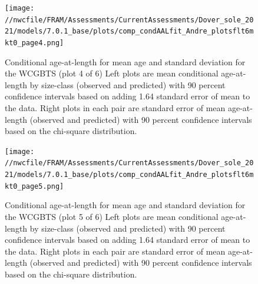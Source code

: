 \documentclass[11pt,
  english,
  a4paper,
]{article}
\begin{document}
\tagmcend\tagstructend


\begin{figure}
\centering
\texttt{[image: //nwcfile/FRAM/Assessments/CurrentAssessments/Dover\_sole\_2021/models/7.0.1\_base/plots/comp\_condAALfit\_Andre\_plotsflt6mkt0\_page4.png]}
\caption{Conditional age-at-length for mean age and standard deviation for the WCGBTS (plot 4 of 6) Left plots are mean conditional age-at-length by size-class (observed and predicted) with 90 percent confidence intervals based on adding 1.64 standard error of mean to the data. Right plots in each pair are standard error of mean age-at-length (observed and predicted) with 90 percent confidence intervals based on the chi-square distribution.\label{fig:wcgbt-caal-fit-4}}
\end{figure}

\tagmcend\tagstructend


\begin{figure}
\centering
\texttt{[image: //nwcfile/FRAM/Assessments/CurrentAssessments/Dover\_sole\_2021/models/7.0.1\_base/plots/comp\_condAALfit\_Andre\_plotsflt6mkt0\_page5.png]}
\caption{Conditional age-at-length for mean age and standard deviation for the WCGBTS (plot 5 of 6) Left plots are mean conditional age-at-length by size-class (observed and predicted) with 90 percent confidence intervals based on adding 1.64 standard error of mean to the data. Right plots in each pair are standard error of mean age-at-length (observed and predicted) with 90 percent confidence intervals based on the chi-square distribution.\label{fig:wcgbt-caal-fit-5}}
\end{figure}
\end{document}
